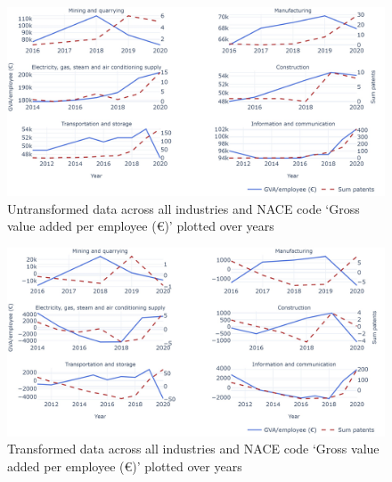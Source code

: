 \documentclass[
  12pt,
  a4paperpaper,
]{article}
\begin{document}
\begin{figure}[H]

{\centering \includegraphics{rieg2023_files/figure-pdf/fig-untransformed-data-value-added-output-1.jpeg}

}

\caption{\label{fig-untransformed-data-value-added}Untransformed data
across all industries and NACE code `Gross value added per employee (€)'
plotted over years}

\end{figure}

\begin{figure}[H]

{\centering \includegraphics{rieg2023_files/figure-pdf/fig-transformed-data-value-added-output-1.jpeg}

}

\caption{\label{fig-transformed-data-value-added}Transformed data across
all industries and NACE code `Gross value added per employee (€)'
plotted over years}

\end{figure}
\end{document}

